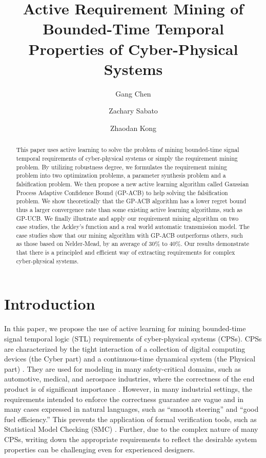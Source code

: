 \documentclass[10pt]{article}
\theoremstyle{plain}
\begin{document}
\title{Active Requirement Mining of Bounded-Time Temporal Properties of Cyber-Physical Systems}
\author{Gang Chen \and Zachary Sabato \and Zhaodan Kong}

\maketitle

\begin{abstract}
This paper uses active learning to solve the problem of mining bounded-time signal temporal requirements of cyber-physical systems or simply the requirement mining problem. By utilizing robustness degree, we formulates the requirement mining problem into two optimization problems, a parameter synthesis problem and a falsification problem. We then propose a new active learning algorithm called Gaussian Process Adaptive Confidence Bound (GP-ACB) to help solving the falsification problem. We show theoretically that the GP-ACB algorithm has a lower regret bound thus a larger convergence rate than some existing active learning algorithms, such as GP-UCB. We finally illustrate and apply our requirement mining algorithm on two case studies, the Ackley's function and a real world automatic transmission model. The case studies show that our mining algorithm with GP-ACB outperforms others, such as those based on Nelder-Mead, by an average of 30\% to 40\%. Our results demonstrate that there is a principled and efficient way of extracting requirements for complex cyber-physical systems. 
\end{abstract}


\section{Introduction}

In this paper, we propose the use of active learning for mining bounded-time signal temporal logic (STL) requirements of cyber-physical systems (CPSs). CPSs are characterized by the tight interaction of a collection of digital computing devices (the Cyber part) and a continuous-time dynamical system (the Physical part) \cite{lee2011introduction,alur2015CPS}. They are used for modeling in many safety-critical domains, such as automotive, medical, and aerospace industries, where the correctness of the end product is of significant importance \cite{jin2014powertrain,rajkumar2010cyber,jiang2012cyber}. However, in many industrial settings, the requirements intended to enforce the correctness guarantee are vague and in many cases expressed in natural languages, such as ``smooth steering'' and ``good fuel efficiency.'' This prevents the application of formal verification tools, such as Statistical Model Checking (SMC) \cite{zuliani2010bayesian}. Further, due to the complex nature of many CPSs, writing down the appropriate requirements to reflect the desirable system properties can be challenging even for experienced designers.
\end{document}

